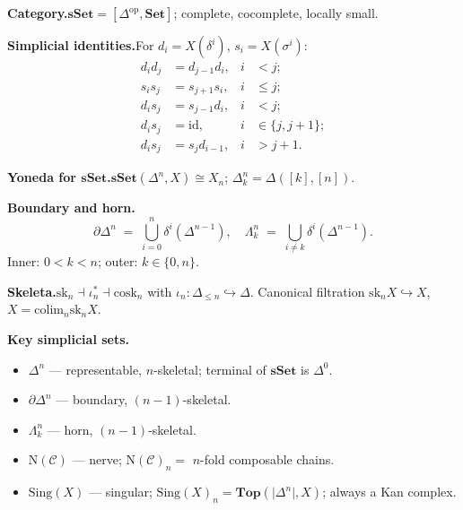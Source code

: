 \begin{formalrestatement}
\textbf{Category.}\quad $\mathbf{sSet} = [\Delta^{\mathrm{op}}, \mathbf{Set}]$;
complete, cocomplete, locally small.

\medskip
\textbf{Simplicial identities.}\quad For $d_i = X(\delta^i)$, $s_i = X(\sigma^i)$:
\begin{align*}
  d_i d_j &= d_{j-1} d_i,            & i &< j; \\
  s_i s_j &= s_{j+1} s_i,            & i &\leq j; \\
  d_i s_j &= s_{j-1} d_i,            & i &< j; \\
  d_i s_j &= \mathrm{id},            & i &\in \{j, j+1\}; \\
  d_i s_j &= s_j d_{i-1},            & i &> j+1.
\end{align*}

\medskip
\textbf{Yoneda for $\mathbf{sSet}$.}\quad $\mathbf{sSet}(\Delta^n, X) \cong X_n$;
$\Delta^n_k = \Delta([k], [n])$.

\medskip
\textbf{Boundary and horn.}\quad
\begin{equation*}
  \partial\Delta^n \;=\; \bigcup_{i = 0}^{n} \delta^i(\Delta^{n-1}), \quad
  \Lambda^n_k \;=\; \bigcup_{i \neq k} \delta^i(\Delta^{n-1}).
\end{equation*}
Inner: $0 < k < n$; outer: $k \in \{0, n\}$.

\medskip
\textbf{Skeleta.}\quad $\mathrm{sk}_n \dashv \iota_n^* \dashv \mathrm{cosk}_n$
with $\iota_n : \Delta_{\leq n} \hookrightarrow \Delta$. Canonical
filtration $\mathrm{sk}_n X \hookrightarrow X$, $X = \mathrm{colim}_n
\mathrm{sk}_n X$.

\medskip
\textbf{Key simplicial sets.}\quad
\begin{itemize}
  \item $\Delta^n$ — representable, $n$-skeletal; terminal of $\mathbf{sSet}$ is $\Delta^0$.
  \item $\partial\Delta^n$ — boundary, $(n-1)$-skeletal.
  \item $\Lambda^n_k$ — horn, $(n-1)$-skeletal.
  \item $\mathrm{N}(\mathcal{C})$ — nerve; $\mathrm{N}(\mathcal{C})_n =$
        $n$-fold composable chains.
  \item $\mathrm{Sing}(X)$ — singular; $\mathrm{Sing}(X)_n =
        \mathbf{Top}(\lvert\Delta^n\rvert, X)$; always a Kan complex.
\end{itemize}
\end{formalrestatement}
